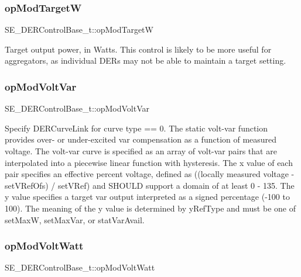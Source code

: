 \subsubsection{\texorpdfstring{op\+Mod\+TargetW}{opModTargetW}}
{\footnotesize\ttfamily S\+E\+\_\+\+D\+E\+R\+Control\+Base\+\_\+t\+::op\+Mod\+TargetW}

Target output power, in Watts. This control is likely to be more useful for aggregators, as individual D\+E\+Rs may not be able to maintain a target setting. \mbox{\label{group__DERControlBase_gac20fb88b06cf1190d01a1fd5ae20c52a}} 
\subsubsection{\texorpdfstring{op\+Mod\+Volt\+Var}{opModVoltVar}}
{\footnotesize\ttfamily S\+E\+\_\+\+D\+E\+R\+Control\+Base\+\_\+t\+::op\+Mod\+Volt\+Var}

Specify D\+E\+R\+Curve\+Link for curve type == 0. The static volt-\/var function provides over-\/ or under-\/excited var compensation as a function of measured voltage. The volt-\/var curve is specified as an array of volt-\/var pairs that are interpolated into a piecewise linear function with hysteresis. The x value of each pair specifies an effective percent voltage, defined as ((locally measured voltage -\/ set\+V\+Ref\+Ofs) / set\+V\+Ref) and S\+H\+O\+U\+LD support a domain of at least 0 -\/ 135. The y value specifies a target var output interpreted as a signed percentage (-\/100 to 100). The meaning of the y value is determined by y\+Ref\+Type and must be one of set\+MaxW, set\+Max\+Var, or stat\+Var\+Avail. \mbox{\label{group__DERControlBase_ga365b1200843285bc313d91791fe583b5}} 
\subsubsection{\texorpdfstring{op\+Mod\+Volt\+Watt}{opModVoltWatt}}
{\footnotesize\ttfamily S\+E\+\_\+\+D\+E\+R\+Control\+Base\+\_\+t\+::op\+Mod\+Volt\+Watt}

